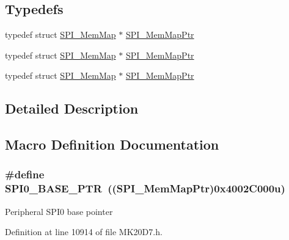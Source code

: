 \subsection*{Typedefs}
\begin{DoxyCompactItemize}
\item 
typedef struct \hyperlink{struct_s_p_i___mem_map}{S\+P\+I\+\_\+\+Mem\+Map} $\ast$ \hyperlink{group___s_p_i___peripheral_ga7e4e9921e4d56bdbb10a04e77743ff5e}{S\+P\+I\+\_\+\+Mem\+Map\+Ptr}
\item 
typedef struct \hyperlink{struct_s_p_i___mem_map}{S\+P\+I\+\_\+\+Mem\+Map} $\ast$ \hyperlink{group___s_p_i___peripheral_ga7e4e9921e4d56bdbb10a04e77743ff5e}{S\+P\+I\+\_\+\+Mem\+Map\+Ptr}
\item 
typedef struct \hyperlink{struct_s_p_i___mem_map}{S\+P\+I\+\_\+\+Mem\+Map} $\ast$ \hyperlink{group___s_p_i___peripheral_ga7e4e9921e4d56bdbb10a04e77743ff5e}{S\+P\+I\+\_\+\+Mem\+Map\+Ptr}
\end{DoxyCompactItemize}


\subsection{Detailed Description}


\subsection{Macro Definition Documentation}
\subsubsection[{\texorpdfstring{S\+P\+I0\+\_\+\+B\+A\+S\+E\+\_\+\+P\+TR}{SPI0_BASE_PTR}}]{\setlength{\rightskip}{0pt plus 5cm}\#define S\+P\+I0\+\_\+\+B\+A\+S\+E\+\_\+\+P\+TR~(({\bf S\+P\+I\+\_\+\+Mem\+Map\+Ptr})0x4002\+C000u)}\hypertarget{group___s_p_i___peripheral_ga851f64a97b5919c1f99a34db5918b3b4}{}\label{group___s_p_i___peripheral_ga851f64a97b5919c1f99a34db5918b3b4}
Peripheral S\+P\+I0 base pointer 

Definition at line 10914 of file M\+K20\+D7.\+h.

